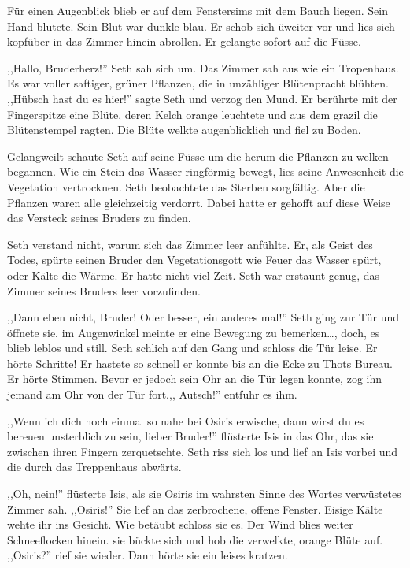 Für einen Augenblick blieb er auf dem Fenstersims mit dem Bauch liegen. Sein Hand blutete. Sein Blut war dunkle blau. Er schob sich üweiter vor und lies sich kopfüber in das Zimmer hinein abrollen. Er gelangte sofort auf die Füsse.

,,Hallo, Bruderherz!'' Seth sah sich um. Das Zimmer sah aus wie ein Tropenhaus. Es war voller saftiger, grüner Pflanzen, die in unzähliger Blütenpracht blühten. ,,Hübsch hast du es hier!'' sagte Seth und verzog den Mund. Er berührte mit der Fingerspitze eine Blüte, deren Kelch orange leuchtete und aus dem grazil die Blütenstempel ragten. Die Blüte welkte augenblicklich und fiel zu Boden.

Gelangweilt schaute Seth auf seine Füsse um die herum die Pflanzen zu welken begannen. Wie ein Stein das Wasser ringförmig bewegt, lies seine Anwesenheit die Vegetation vertrocknen. Seth beobachtete das Sterben sorgfältig. Aber die Pflanzen waren alle gleichzeitig verdorrt. Dabei hatte er gehofft auf diese Weise das Versteck seines Bruders zu finden. 

Seth verstand nicht, warum sich das Zimmer leer anfühlte. Er, als Geist des Todes, spürte seinen Bruder den Vegetationsgott wie Feuer das Wasser spürt, oder Kälte die Wärme. Er hatte nicht viel Zeit. Seth war erstaunt genug, das Zimmer seines Bruders leer vorzufinden. 

,,Dann eben nicht, Bruder! Oder besser, ein anderes mal!'' Seth ging zur Tür und öffnete sie. im Augenwinkel meinte er eine Bewegung zu bemerken\dots , doch, es blieb leblos und still. Seth schlich auf den Gang und schloss die Tür leise. Er hörte Schritte! Er hastete so schnell er konnte bis  an die Ecke zu Thots Bureau. Er hörte Stimmen. Bevor er jedoch sein Ohr an die Tür legen konnte, zog ihn jemand am Ohr von der Tür fort.,, Autsch!'' entfuhr es ihm.

,,Wenn ich dich noch einmal so nahe bei Osiris erwische, dann wirst du es bereuen unsterblich zu sein, lieber Bruder!'' flüsterte Isis in das Ohr, das sie zwischen ihren Fingern zerquetschte. Seth riss sich los und lief an Isis vorbei und die durch das Treppenhaus abwärts.

\sterne

,,Oh, nein!'' flüsterte Isis, als sie Osiris im wahrsten Sinne des Wortes verwüstetes Zimmer sah. ,,Osiris!'' Sie lief an das zerbrochene, offene Fenster. Eisige Kälte wehte ihr ins Gesicht. Wie betäubt schloss sie es. Der Wind blies weiter Schneeflocken hinein. sie bückte sich und hob die verwelkte, orange Blüte auf. ,,Osiris?'' rief sie wieder. Dann hörte sie ein leises kratzen.

